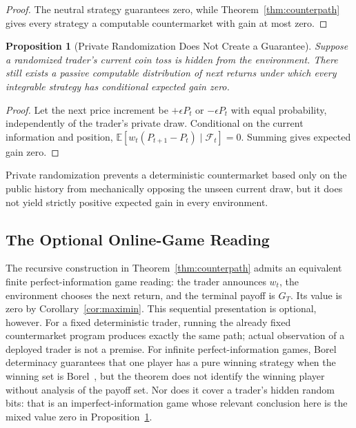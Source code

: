 \documentclass[aps,pra,reprint,superscriptaddress,amsmath,amssymb,floatfix]{revtex4-2}
\theoremstyle{plain}
\newtheorem{proposition}[theorem]{Proposition}
\theoremstyle{definition}
\theoremstyle{remark}
\begin{document}
\begin{proof}
The neutral strategy guarantees zero, while
Theorem~\ref{thm:counterpath} gives every strategy a computable countermarket
with gain at most zero.
\end{proof}

\begin{proposition}[Private Randomization Does Not Create a Guarantee]
  \label{prop:randomized}
  Suppose a randomized trader's current coin toss is hidden from the
  environment. There still exists a passive computable distribution of next
  returns under which every integrable strategy has conditional expected gain
  zero.
\end{proposition}

\begin{proof}
Let the next price increment be \(+\epsilon P_t\) or \(-\epsilon P_t\) with
equal probability, independently of the trader's private draw. Conditional on
the current information and position,
\(\mathbb{E}[w_t(P_{t+1}-P_t)\mid\mathcal{F}_t]=0\).
Summing gives expected gain zero.
\end{proof}

Private randomization prevents a deterministic countermarket based only on the
public history from mechanically opposing the unseen current draw, but it does
not yield strictly positive expected gain in every environment.

\subsection{The Optional Online-Game Reading}

The recursive construction in Theorem~\ref{thm:counterpath} admits an
equivalent finite perfect-information game reading: the trader announces
\(w_t\), the environment chooses the next return, and the terminal payoff is
\(G_T\). Its value is zero by Corollary~\ref{cor:maximin}. This sequential
presentation is optional, however. For a fixed deterministic trader, running
the already fixed countermarket program produces exactly the same path; actual
observation of a deployed trader is not a premise. For infinite
perfect-information games, Borel determinacy guarantees that one player has a
pure winning strategy when the winning set is Borel~\cite{Martin1975}, but the
theorem does not identify the winning player without analysis of the payoff
set. Nor does it cover a trader's hidden random bits: that is an
imperfect-information game whose relevant conclusion here is the mixed value
zero in Proposition~\ref{prop:randomized}.
\end{document}
